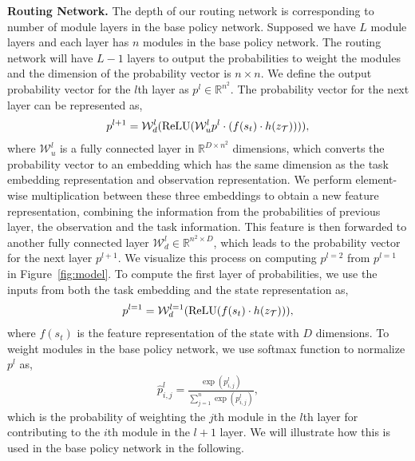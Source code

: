 \documentclass{article}
\newcommand{\task}{\mathcal{T}}
\begin{document}
\textbf{Routing Network.} The depth of our routing network is corresponding to number of module layers in the base policy network. Supposed we have $L$ module layers and each layer has $n$ modules in the base policy network. The routing network will have $L-1$ layers to output the probabilities to weight the modules and the dimension of the probability vector is $n \times n$. We define the output probability vector for the $l$th layer as $p^l \in \mathbb{R}^{n^2}$. The probability vector for the next layer can be represented as,
{{
\begin{align}
p^{l+1} = \mathcal{W}^{l}_d ({\rm ReLU}(\mathcal{W}^{l}_u p^{l} \cdot( f(s_t) \cdot h(z_\task))) ),
\end{align}}}
where $\mathcal{W}^{l}_u$ is a fully connected layer in $\mathbb{R}^{D \times n^2}$ dimensions, which converts the probability vector to an embedding which has the same dimension as the task embedding representation and observation representation. We perform element-wise multiplication between these three embeddings to obtain a new feature representation, combining the information from the probabilities of previous layer, the observation and the task information. This feature is then forwarded to another fully connected layer $\mathcal{W}^{l}_d \in \mathbb{R}^{n^2 \times D}$, which leads to the probability vector for the next layer $p^{l+1}$. We visualize this process on computing $p^{l=2}$ from $p^{l=1}$ in Figure~\ref{fig:model}. To compute the first layer of probabilities, we use the inputs from both the task embedding and the state representation as,
\begin{align}
p^{l=1} = \mathcal{W}^{l=1}_d ({\rm ReLU}(f(s_t) \cdot h(z_\task)) ),
\end{align}
where $f(s_t)$ is the feature representation of the state with $D$ dimensions. To weight modules in the base policy network, we use softmax function to normalize $p^{l}$ as,
\vspace{-0.05in}
\begin{align}
\hat{p}^{l}_{i,j} = \frac{\exp{(p^{l}_{i,j})}}{\sum_{j=1}^{n}\exp{(p^{l}_{i,j})}},
\label{eq:prop}
\end{align}
which is the probability of weighting the $j$th module in the $l$th layer for contributing to the $i$th module in the $l+1$ layer. We will illustrate how this is used in the base policy network in the following.
\end{document}
